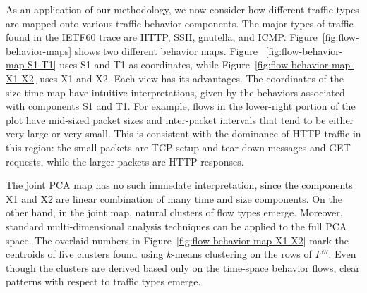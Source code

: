 \documentclass[conference]{IEEEtran}
\newcommand{\caps}[1]{{\small{#1}}}
\begin{document}
As an application of our methodology, we now consider how different traffic types are mapped onto various traffic behavior components. The major types of traffic found in the \caps{IETF60} trace are \caps{HTTP}, \caps{SSH}, gnutella, and \caps{ICMP}. Figure~\ref{fig:flow-behavior-maps} shows two different behavior maps. Figure ~\ref{fig:flow-behavior-map-S1-T1} uses \caps{S1} and \caps{T1} as coordinates, while Figure~\ref{fig:flow-behavior-map-X1-X2} uses \caps{X1} and \caps{X2}. Each view has its advantages. The coordinates of the size-time map have intuitive interpretations, given by the behaviors associated with components \caps{S1} and \caps{T1}. For example, flows in the lower-right portion of the plot have mid-sized packet sizes and inter-packet intervals that tend to be either very large or very small. This is consistent with the dominance of \caps{HTTP} traffic in this region: the small packets are \caps{TCP} setup and tear-down messages and \caps{GET} requests, while the larger packets are \caps{HTTP} responses.

The joint \caps{PCA} map has no such immedate interpretation, since the components \caps{X1} and \caps{X2} are linear combination of many time and size components. On the other hand, in the joint map, natural clusters of flow types emerge. Moreover, standard multi-dimensional analysis techniques can be applied to the full \caps{PCA} space. The overlaid numbers in Figure~\ref{fig:flow-behavior-map-X1-X2} mark the centroids of five clusters found using $k$-means clustering on the rows of $F'''$. %
Even though the clusters are derived based only on the time-space behavior flows, clear patterns with respect to traffic types emerge.
\end{document}
